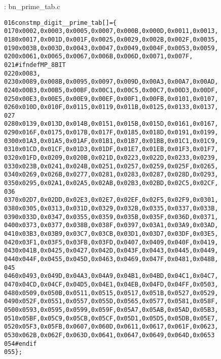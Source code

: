 \documentclass[b5paper]{book}
\begin{document}
\vspace{+3mm}\begin{small}
\hspace{-5.1mm}{\bf File}: bn\_prime\_tab.c
\vspace{-3mm}
\begin{alltt}
016   const mp_digit __prime_tab[] = \{
017     0x0002, 0x0003, 0x0005, 0x0007, 0x000B, 0x000D, 0x0011, 0x0013,
018     0x0017, 0x001D, 0x001F, 0x0025, 0x0029, 0x002B, 0x002F, 0x0035,
019     0x003B, 0x003D, 0x0043, 0x0047, 0x0049, 0x004F, 0x0053, 0x0059,
020     0x0061, 0x0065, 0x0067, 0x006B, 0x006D, 0x0071, 0x007F,
021   #ifndef MP_8BIT
022     0x0083,
023     0x0089, 0x008B, 0x0095, 0x0097, 0x009D, 0x00A3, 0x00A7, 0x00AD,
024     0x00B3, 0x00B5, 0x00BF, 0x00C1, 0x00C5, 0x00C7, 0x00D3, 0x00DF,
025     0x00E3, 0x00E5, 0x00E9, 0x00EF, 0x00F1, 0x00FB, 0x0101, 0x0107,
026     0x010D, 0x010F, 0x0115, 0x0119, 0x011B, 0x0125, 0x0133, 0x0137,
027   
028     0x0139, 0x013D, 0x014B, 0x0151, 0x015B, 0x015D, 0x0161, 0x0167,
029     0x016F, 0x0175, 0x017B, 0x017F, 0x0185, 0x018D, 0x0191, 0x0199,
030     0x01A3, 0x01A5, 0x01AF, 0x01B1, 0x01B7, 0x01BB, 0x01C1, 0x01C9,
031     0x01CD, 0x01CF, 0x01D3, 0x01DF, 0x01E7, 0x01EB, 0x01F3, 0x01F7,
032     0x01FD, 0x0209, 0x020B, 0x021D, 0x0223, 0x022D, 0x0233, 0x0239,
033     0x023B, 0x0241, 0x024B, 0x0251, 0x0257, 0x0259, 0x025F, 0x0265,
034     0x0269, 0x026B, 0x0277, 0x0281, 0x0283, 0x0287, 0x028D, 0x0293,
035     0x0295, 0x02A1, 0x02A5, 0x02AB, 0x02B3, 0x02BD, 0x02C5, 0x02CF,
036   
037     0x02D7, 0x02DD, 0x02E3, 0x02E7, 0x02EF, 0x02F5, 0x02F9, 0x0301,
038     0x0305, 0x0313, 0x031D, 0x0329, 0x032B, 0x0335, 0x0337, 0x033B,
039     0x033D, 0x0347, 0x0355, 0x0359, 0x035B, 0x035F, 0x036D, 0x0371,
040     0x0373, 0x0377, 0x038B, 0x038F, 0x0397, 0x03A1, 0x03A9, 0x03AD,
041     0x03B3, 0x03B9, 0x03C7, 0x03CB, 0x03D1, 0x03D7, 0x03DF, 0x03E5,
042     0x03F1, 0x03F5, 0x03FB, 0x03FD, 0x0407, 0x0409, 0x040F, 0x0419,
043     0x041B, 0x0425, 0x0427, 0x042D, 0x043F, 0x0443, 0x0445, 0x0449,
044     0x044F, 0x0455, 0x045D, 0x0463, 0x0469, 0x047F, 0x0481, 0x048B,
045   
046     0x0493, 0x049D, 0x04A3, 0x04A9, 0x04B1, 0x04BD, 0x04C1, 0x04C7,
047     0x04CD, 0x04CF, 0x04D5, 0x04E1, 0x04EB, 0x04FD, 0x04FF, 0x0503,
048     0x0509, 0x050B, 0x0511, 0x0515, 0x0517, 0x051B, 0x0527, 0x0529,
049     0x052F, 0x0551, 0x0557, 0x055D, 0x0565, 0x0577, 0x0581, 0x058F,
050     0x0593, 0x0595, 0x0599, 0x059F, 0x05A7, 0x05AB, 0x05AD, 0x05B3,
051     0x05BF, 0x05C9, 0x05CB, 0x05CF, 0x05D1, 0x05D5, 0x05DB, 0x05E7,
052     0x05F3, 0x05FB, 0x0607, 0x060D, 0x0611, 0x0617, 0x061F, 0x0623,
053     0x062B, 0x062F, 0x063D, 0x0641, 0x0647, 0x0649, 0x064D, 0x0653
054   #endif
055   \};
\end{alltt}
\end{small}
\end{document}
